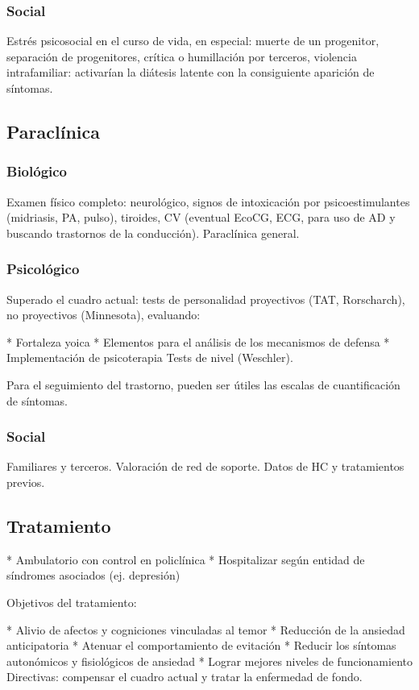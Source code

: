 \documentclass{scrbook}
\begin{document}
\subsubsection*{Social}

Estrés psicosocial en el curso de vida, en especial: muerte de un progenitor, separación de progenitores, crítica o humillación por terceros, violencia intrafamiliar: activarían la diátesis latente con la consiguiente aparición de síntomas.

\subsection*{Paraclínica}
\subsubsection*{Biológico}
Examen físico completo: neurológico, signos de intoxicación por psicoestimulantes (midriasis, PA, pulso), tiroides, CV (eventual EcoCG, ECG, para uso de AD y buscando trastornos de la conducción). Paraclínica general.
\subsubsection*{Psicológico}
Superado el cuadro actual: tests de personalidad proyectivos (TAT, Rorscharch), no proyectivos (Minnesota), evaluando:

* Fortaleza yoica
* Elementos para el análisis de los mecanismos de defensa
* Implementación de psicoterapia Tests de nivel (Weschler).

Para el seguimiento del trastorno, pueden ser útiles las escalas de cuantificación de síntomas.
\subsubsection*{Social}
Familiares y terceros. Valoración de red de soporte. Datos de HC y tratamientos previos.
\subsection*{Tratamiento}
* Ambulatorio con control en policlínica
* Hospitalizar según entidad de síndromes asociados (ej. depresión)

Objetivos del tratamiento:

* Alivio de afectos y cogniciones vinculadas al temor
* Reducción de la ansiedad anticipatoria
* Atenuar el comportamiento de evitación
* Reducir los síntomas autonómicos y fisiológicos de ansiedad
* Lograr mejores niveles de funcionamiento Directivas: compensar el cuadro actual y tratar la enfermedad de fondo.
\end{document}
